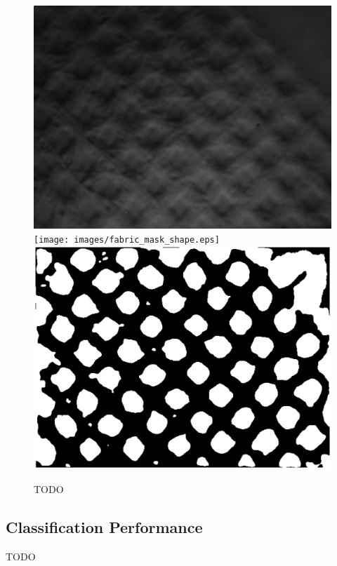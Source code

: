 \documentclass[10pt,twocolumn,letterpaper]{article}
\begin{document}
\begin{figure}[ht]
\includegraphics[width=\textwidth]{images/fabric_mask_image.png}
\endminipage\hfill
{}
\texttt{[image: images/fabric\_mask\_shape.eps]}
\endminipage\hfill
{}
\includegraphics[width=\textwidth]{images/fabric_mask.eps}
\endminipage\\

\caption{TODO}
\end{figure}




\subsection{Classification Performance}
TODO
\end{document}
